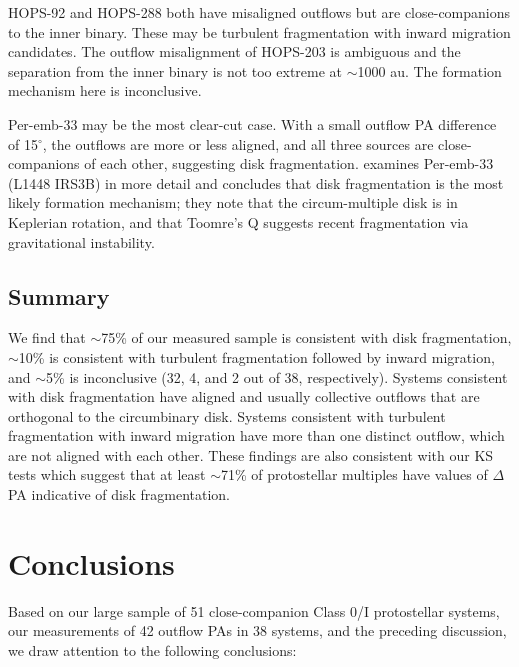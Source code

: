 \documentclass[linenumbers,twocolumn, twocolappendix]{aastex631}
\begin{document}
HOPS-92 and HOPS-288 both have misaligned outflows but are close-companions to the inner binary. These may be turbulent fragmentation with inward migration candidates. The outflow misalignment of HOPS-203 is ambiguous and the separation from the inner binary is not too extreme at $\sim$1000 au. The formation mechanism here is inconclusive. 

Per-emb-33 may be the most clear-cut case. With a small outflow PA difference of 15$^\circ$, the outflows are more or less aligned, and all three sources are close-companions of each other, suggesting disk fragmentation. \cite{Reynolds_et_al_2021} examines Per-emb-33 (L1448 IRS3B) in more detail and concludes that disk fragmentation is the most likely formation mechanism; they note that the circum-multiple disk is in Keplerian rotation, and that Toomre's Q suggests recent fragmentation via gravitational instability.

\subsection{Summary} \label{sec:dis:summary}
We find that $\sim$75\% of our measured sample is consistent with disk fragmentation, $\sim$10\% is consistent with turbulent fragmentation followed by inward migration, and $\sim$5\% is inconclusive (32, 4, and 2 out of 38, respectively). Systems consistent with disk fragmentation have aligned and usually collective outflows that are orthogonal to the circumbinary disk. Systems consistent with turbulent fragmentation with inward migration have more than one distinct outflow, which are not aligned with each other. These findings are also consistent with our KS tests which suggest that at least $\sim$71\% of protostellar multiples have values of $\Delta$PA indicative of disk fragmentation.

\section{Conclusions} \label{sec:conc}
Based on our large sample of 51 close-companion Class 0/I protostellar systems, our measurements of 42 outflow PAs in 38 systems, and the preceding discussion, we draw attention to the following conclusions:
\end{document}
